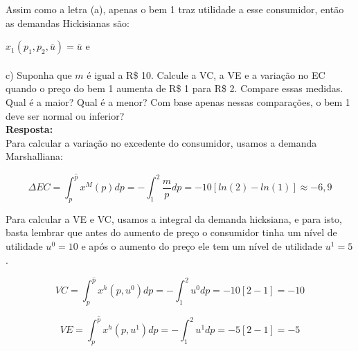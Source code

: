 \begin{enumerate}
Assim como a letra (a), apenas o bem 1 traz utilidade a esse consumidor, então as demandas Hickisianas são:\\

\begin{center}
{$x_{1}(p_{1},p_{2}, \overline{u}) = \overline{u}$} \hspace{0.5cm} e  \\
\end{center}


\paragraph{} c) Suponha que {$m$} é igual a R\$ 10. Calcule a VC, a VE e a variação no EC quando o preço
do bem 1 aumenta de R\$ 1 para R\$ 2. Compare essas medidas. Qual é a maior? Qual é a menor? Com base apenas nessas comparações, o bem 1 deve ser normal ou inferior?\\

\textbf{Resposta:}\\

Para calcular a variação no excedente do consumidor, usamos a demanda Marshalliana: 

\begin{center}
\begin{equation}
\Delta EC = \int_{p}^{\hat{p}} x^{M}(p)dp = - \int_{1}^{2} \dfrac{m}{p}dp = -10[ln(2) - ln(1)]\approx - 6,9
\end{equation}
\end{center}


Para calcular a VE e VC, usamos a integral da demanda hicksiana, e para isto, basta lembrar que antes do aumento de preço o consumidor tinha um nível de utilidade {$u^{0} = 10$} e após o aumento do preço ele tem um nível de utilidade {$u^{1} = 5$}.\\

\begin{center}
\begin{equation}
VC = \int_{p}^{\hat{p}}x^{h}(p, u^{0})dp = - \int_{1}^{2} u^{0}dp = - 10[2-1] = - 10
\end{equation}
\end{center}

\begin{center}
\begin{equation}
VE = \int_{p}^{\hat{p}} x^{h}(p, u^{1})dp = - \int_{1}^{2} u^{1}dp = - 5[2-1] = - 5
\end{equation}
\end{center}


\end{enumerate}
